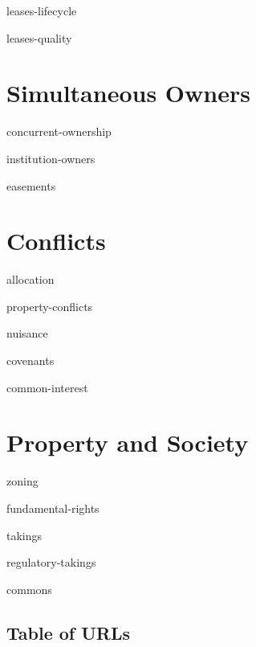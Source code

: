 \documentclass[12pt]{book}
\begin{document}
\module leases-lifecycle

\module leases-quality




\edmaterialfalse

\makevolume

\tableofcontents

\mainmatter


\part{Simultaneous Owners}

\module concurrent-ownership

\module institution-owners

\module easements



\part{Conflicts}

\module allocation

\module property-conflicts

\module nuisance

\module covenants

\module common-interest





\part{Property and Society}

\module zoning

\module fundamental-rights

\module takings

\module regulatory-takings

\module commons


\backmatter



\chapter{Table of URLs}

\begingroup
\footnotesize

\TableOfUrls

\endgroup


\end{document}
